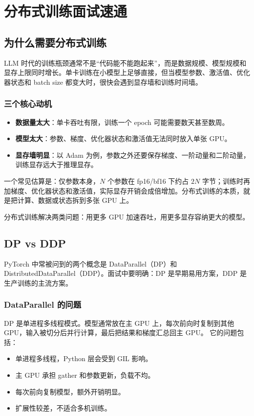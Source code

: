 \chapter{分布式训练面试速通}
\section{为什么需要分布式训练}
LLM 时代的训练瓶颈通常不是``代码能不能跑起来''，而是数据规模、模型规模和显存上限同时增长。单卡训练在小模型上足够直接，但当模型参数、激活值、优化器状态和 batch size 都变大时，很快会遇到显存墙和训练时间墙。
\subsection{三个核心动机}
\begin{itemize}
  \item \textbf{数据量太大}：单卡吞吐有限，训练一个 epoch 可能需要数天甚至数周。
  \item \textbf{模型太大}：参数、梯度、优化器状态和激活值无法同时放入单张 GPU。
  \item \textbf{显存墙明显}：以 Adam 为例，参数之外还要保存梯度、一阶动量和二阶动量，训练显存远大于推理显存。
\end{itemize}
一个常见估算是：仅参数本身，$N$ 个参数在 fp16/bf16 下约占 $2N$ 字节；训练时再加梯度、优化器状态和激活值，实际显存开销会成倍增加。分布式训练的本质，就是把计算、数据或状态拆到多张 GPU 上。
\begin{quickcard}
分布式训练解决两类问题：用更多 GPU 加速吞吐，用更多显存容纳更大的模型。
\end{quickcard}
\section{DP vs DDP}
PyTorch 中常被问到的两个概念是 DataParallel（DP）和 DistributedDataParallel（DDP）。面试中要明确：DP 是早期易用方案，DDP 是生产训练的主流方案。
\subsection{DataParallel 的问题}
DP 是单进程多线程模式。模型通常放在主 GPU 上，每次前向时复制到其他 GPU，输入被切分后并行计算，最后把结果和梯度汇总回主 GPU。
它的问题包括：
\begin{itemize}
  \item 单进程多线程，Python 层会受到 GIL 影响。
  \item 主 GPU 承担 gather 和参数更新，负载不均。
  \item 每次前向复制模型，额外开销明显。
  \item 扩展性较差，不适合多机训练。
\end{itemize}
